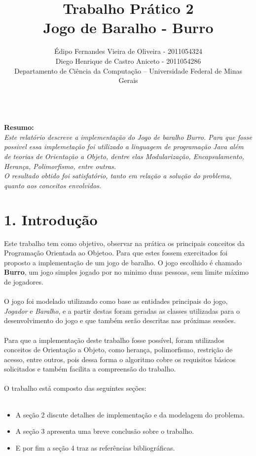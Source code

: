 \documentclass[12pt, a4paper]{article}
\begin{document}

 \title{Trabalho Prático 2 \\ Jogo de Baralho - Burro \\}
 \author{Édipo Fernandes Vieira de Oliveira - 2011054324\\ Diego Henrique de Castro Aniceto - 2011054286\\Departamento de Ciência da Computação -- Universidade Federal de Minas Gerais\\}
  \maketitle


\textbf{\textit \\Resumo: }
\textit{\\ Este relatório descreve a implementação do Jogo de baralho Burro. Para que fosse possivel essa implemetação foi utilizado a linguagem de programação Java além de teorias de Orientação a Objeto, dentre elas Modularização, Encapsulamento, Herança, Polimorfismo, entre outras.\\
  O resultado obtido foi satisfatório, tanto em relação a solução do problema, quanto aos conceitos envolvidos.}
\section*{1. Introdução}

  Este trabalho tem como objetivo, observar na prática os principais conceitos da Programação Orientada ao Objetoo. Para que estes fossem exercitados foi proposto a implementação de um jogo de baralho. O jogo escolhido é chamado \textbf{Burro}, um jogo simples jogado por no minimo duas pessoas, sem limite máximo de jogadores.
  \\\\
  O jogo foi modelado utilizando como base as entidades principais do jogo, \textit{Jogador} e \textit{Baralho}, e a partir destas foram geradas as classes utilizadas para o desenvolvimento do jogo e que também serão descritas nas próximas sessões.
  \\\\
  Para que a implementação deste trabalho fosse possível, foram utilizados conceitos de Orientação a Objeto, como herança, polimorfismo, restrição de acesso, entre outros, pois dessa forma o algoritmo cobre os requisitos básicos solicitados e também facilita a compreensão do trabalho.
  \\\\
  O trabalho está composto das seguintes seções:\\\\
  \begin{itemize}
    \item A seção 2 discute detalhes de implementação e da modelagem do problema.
    \item A seção 3 apresenta uma breve conclusão sobre o trabalho.
    \item E por fim a seção 4 traz as referências bibliográficas.
  \end{itemize}
\end{document}
